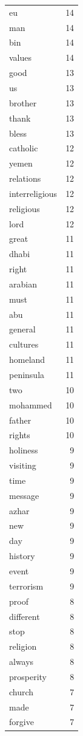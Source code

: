 \begin{tabular}{lr}
eu & 14 \\
man & 14 \\
bin & 14 \\
values & 14 \\
good & 13 \\
us & 13 \\
brother & 13 \\
thank & 13 \\
bless & 13 \\
catholic & 12 \\
yemen & 12 \\
relations & 12 \\
interreligious & 12 \\
religious & 12 \\
lord & 12 \\
great & 11 \\
dhabi & 11 \\
right & 11 \\
arabian & 11 \\
must & 11 \\
abu & 11 \\
general & 11 \\
cultures & 11 \\
homeland & 11 \\
peninsula & 11 \\
two & 10 \\
mohammed & 10 \\
father & 10 \\
rights & 10 \\
holiness & 9 \\
visiting & 9 \\
time & 9 \\
message & 9 \\
azhar & 9 \\
new & 9 \\
day & 9 \\
history & 9 \\
event & 9 \\
terrorism & 9 \\
proof & 8 \\
different & 8 \\
stop & 8 \\
religion & 8 \\
always & 8 \\
prosperity & 8 \\
church & 7 \\
made & 7 \\
forgive & 7 \\

\end{tabular}
